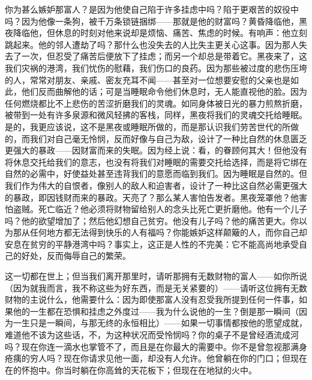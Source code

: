 你为甚么嫉妒那富人？是因为他使自己陷于许多挂虑中吗？陷于更艰苦的奴役中吗？因为他像一条狗，被千万条锁链捆绑——那就是他的财富吗？黄昏降临他，黑夜降临他，但休息的时刻对他来说却是烦恼、痛苦、焦虑的时候。有响声：他立刻跳起来。他的邻人遭劫了吗？那什么也没失去的人比失主更关心这事。因为那人失去了一次，但忍受了痛苦后便放下了挂虑；而另一个却总是带着它。黑夜来了，这我们灾祸的港湾，我们忧伤的慰藉，我们伤口的良药。因为那些被过度的悲伤压垮的人，常常对朋友、亲戚、密友充耳不闻——甚至对一位想要安慰的父亲也是如此，他们反而曲解他的话；可是当睡眠命令他们休息时，无人能直视他的脸。因为任何燃烧都比不上悲伤的苦涩折磨我们的灵魂。如同身体被日光的暴力煎熬折磨，被带到一处有许多泉源和微风轻拂的客栈，同样，黑夜将我们的灵魂交托给睡眠。是的，我更应该说，这不是黑夜或睡眠所做的，而是那认识我们劳苦世代的所做的，而我们对自己毫无怜悯，反而好像与自己为敌，设计了一种比自然的休息匮乏更强大的暴政——因财富而来的失眠。因为经上说：看，的眷顾何其大！但他没有将休息交托给我们的意志，也没有将我们对睡眠的需要交托给选择，而是将它绑在自然的必需中，好使益处甚至违背我们的意愿而临到我们。因为睡眠是自然的。但我们作为伟大的自恨者，像别人的敌人和迫害者，设计了一种比这自然必需更强大的暴政，即因钱财而来的暴政。天亮了？那么某人害怕告发者。黑夜笼罩他？他害怕盗贼。死亡临近？他必须将财物留给别人的念头比死亡更折磨他。他有一个儿子吗？他的欲望增加了；然后他幻想自己贫穷。他没有儿子吗？他的痛苦更大。你以为那从任何地方都无法得到快乐的人有福吗？你能嫉妒这样颠簸的人，而你自己却安息在贫穷的平静港湾中吗？事实上，这正是人性的不完美：它不能高尚地承受自己的好处，反而侮辱自己的繁荣。\par

这一切都在世上；但当我们离开那里时，请听那拥有无数财物的富人——如你所说（因为就我而言，我不称这些为好东西，而是无关紧要的）——请听这位拥有无数财物的主说什么，他需要什么：因为即使那富人没有忍受我所提到任何一件事，如果他的一生都在恐惧和挂虑之外度过——我为什么说他的一生？倒是那一瞬间（因为一生只是一瞬间，与那无终的永恒相比）——如果一切事情都按他的愿望成就，难道他不该为这些话，不，为这种状况而受怜悯吗？你的桌子不是曾经酒流成河吗？现在你连一滴水也掌管不了，而且是在你最大的需要中。你不是曾忽视那满身疮痍的穷人吗？现在你请求见他一面，却没有人允许。他曾躺在你的门口；但现在在的怀抱中。你当时躺在你高耸的天花板下；但现在在地狱的火中。\par

